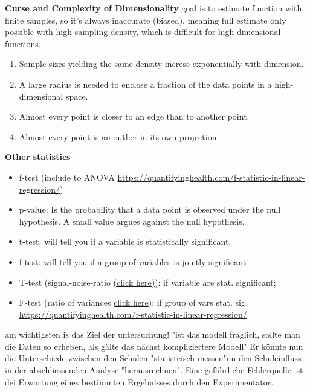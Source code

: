\textbf{Curse and Complexity of Dimensionality}
goal is to estimate function with finite samples, so it's always inaccurate (biased). 
meaning full estimate only possible with high sampling density, which is difficult for high dimensional functions.
\begin{enumerate}
	\item Sample sizes yielding the same density increse exponentially with dimension.
	\item A large radius is needed to enclose a fraction of the data points in a high-dimensional space.
	\item Almost every point is closer to an edge than to another point.
	\item Almost every point  is an outlier in its own projection.
\end{enumerate}
\textbf{Other statistics}
\begin{itemize}
    \item f-test (include to ANOVA \url{https://quantifyinghealth.com/f-statistic-in-linear-regression/})
    \item p-value: Is the probability that a data point is observed under the null hypothesis. A small value argues against the null hypothesis. 
    \item t-test: will tell you if a variable is statistically significant. 
    \item f-test: will tell you if a group of variables is jointly significant
    \item T-test (signal-noise-ratio \href{https://statisticsbyjim.com/hypothesis-testing/t-tests-1-sample-2-sample-paired-t-tests/}{(click here)}): if variable are stat. significant; 
    \item F-test (ratio of variances \href{https://statisticsbyjim.com/anova/f-tests-anova/}{click here}): if group of vars stat. sig \url{https://quantifyinghealth.com/f-statistic-in-linear-regression/}
\end{itemize}

am wichtigsten is das Ziel der untersuchung! \cite{haertler2014statistisch}
"ist das modell fraglich, sollte man die Daten so erheben, als gälte das nächst kompliziertere Modell" \cite{haertler2014statistisch}
Er könnte nun die Unterschiede zwischen den Schulen "statisteisch messen"un den Schuleinfluss in der abschliessenden Analyse "herausrechnen". \cite{haertler2014statistisch}
Eine gefährliche Fehlerquelle ist dei Erwartung eines bestimmten Ergebnisses durch den Experimentator. \cite{haertler2014statistisch}
